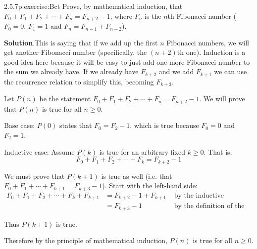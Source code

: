 \documentclass[twoside,11pt,]{book}
\newcommand{\blocktitlefont}{\relax}
\numberwithin{equation}{chapter}
\newcommand{\amp}{&}
\begin{document}
\begin{divisionsolution}{2.5.7}{}{p:exercise:Bct}%
Prove, by mathematical induction, that \(F_0 + F_1 + F_2 + \cdots + F_{n} = F_{n+2} - 1\), where \(F_n\) is the \(n\)th Fibonacci number (\(F_0 = 0\), \(F_1 = 1\) and \(F_n = F_{n-1} + F_{n-2}\)).%
\par\smallskip%
\noindent\textbf{\blocktitlefont Solution}.\quad{}This is saying that if we add up the first \(n\) Fibonacci numbers, we will get another Fibonacci number (specifically, the \((n+2)\)th one). Induction is a good idea here because it will be easy to just add one more Fibonacci number to the sum we already have. If we already have \(F_{k+2}\) and we add \(F_{k+1}\) we can use the recurrence relation to simplify this, becoming \(F_{k+3}\).%
\begin{solutionproof}
Let \(P(n)\) be the statement \(F_0 + F_1 + F_2 + \cdots + F_n = F_{n+2} - 1\). We will prove that \(P(n)\) is true for all \(n \ge 0\).%
\par
Base case: \(P(0)\) states that \(F_0 = F_2 - 1\), which is true because \(F_0 = 0\) and \(F_2 = 1\).%
\par
Inductive case: Assume \(P(k)\) is true for an arbitrary fixed \(k \ge 0\). That is,%
\begin{equation*}
F_0 + F_1 + F_2 + \cdots + F_k = F_{k+2} - 1
\end{equation*}
%
\par
We must prove that \(P(k+1)\) is true as well (i.e. that \(F_0 + F_1 + \cdots +F_{k+1} = F_{k+3} - 1\)). Start with the left-hand side:%
\begin{align*}
F_0 + F_1 + F_2 + \cdots + F_k + F_{k+1} \amp = F_{k+2} - 1 + F_{k+1} \amp \mbox{ by the inductive hypothesis}\\
\amp = F_{k+3} - 1 \amp \mbox{ by the definition of the Fibonacci numbers}
\end{align*}
%
\par
Thus \(P(k+1)\) is true.%
\par
Therefore by the principle of mathematical induction, \(P(n)\) is true for all \(n \ge 0\).%
\end{solutionproof}
\end{divisionsolution}%
\end{document}
